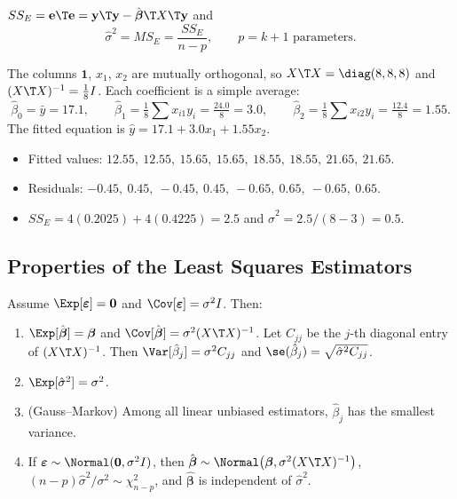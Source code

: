 \begin{definition}
$SS_E=\mathbf{e}\T\mathbf{e}=\mathbf{y}\T\mathbf{y}-\hat{\boldsymbol\beta}\T X\T\mathbf{y}$ and
\[ \hat\sigma^2=MS_E=\frac{SS_E}{n-p},\qquad p=k+1\text{ parameters.} \]
\end{definition}

\begin{example}\label{ex:mlrfit}
The columns $\mathbf{1}$, $x_1$, $x_2$ are mutually orthogonal, so $X\T X=\diag(8,8,8)$ and $(X\T X)^{-1}=\tfrac18I$. Each coefficient is a simple average:
\[ \hat\beta_0=\bar{y}=17.1,\qquad \hat\beta_1=\tfrac18\sum x_{i1}y_i=\tfrac{24.0}{8}=3.0,\qquad \hat\beta_2=\tfrac18\sum x_{i2}y_i=\tfrac{12.4}{8}=1.55. \]
The fitted equation is $\hat{y}=17.1+3.0x_1+1.55x_2$.
\begin{itemize}
  \item Fitted values: $12.55,\ 12.55,\ 15.65,\ 15.65,\ 18.55,\ 18.55,\ 21.65,\ 21.65$.
  \item Residuals: $-0.45,\ 0.45,\ -0.45,\ 0.45,\ -0.65,\ 0.65,\ -0.65,\ 0.65$.
  \item $SS_E=4(0.2025)+4(0.4225)=2.5$ and $\hat\sigma^2=2.5/(8-3)=0.5$.
\end{itemize}
\end{example}

\subsection{Properties of the Least Squares Estimators}

\begin{theorem}\label{thm:mlr-dist}
Assume $\Exp[\boldsymbol\varepsilon]=\mathbf{0}$ and $\Cov[\boldsymbol\varepsilon]=\sigma^2I$. Then:
\begin{enumerate}[label=(\roman*)]
  \item $\Exp[\hat{\boldsymbol\beta}]=\boldsymbol\beta$ and $\Cov[\hat{\boldsymbol\beta}]=\sigma^2(X\T X)^{-1}$. Let $C_{jj}$ be the $j$-th diagonal entry of $(X\T X)^{-1}$. Then $\Var[\hat\beta_j]=\sigma^2C_{jj}$ and $\se(\hat\beta_j)=\sqrt{\hat\sigma^2C_{jj}}$.
  \item $\Exp[\hat\sigma^2]=\sigma^2$.
  \item (Gauss--Markov) Among all linear unbiased estimators, $\hat\beta_j$ has the smallest variance.
  \item If $\boldsymbol\varepsilon\sim\Normal(\mathbf{0},\sigma^2I)$, then $\hat{\boldsymbol\beta}\sim\Normal\big(\boldsymbol\beta,\sigma^2(X\T X)^{-1}\big)$, $(n-p)\hat\sigma^2/\sigma^2\sim\chi^2_{n-p}$, and $\hat{\boldsymbol\beta}$ is independent of $\hat\sigma^2$.
\end{enumerate}
\end{theorem}


